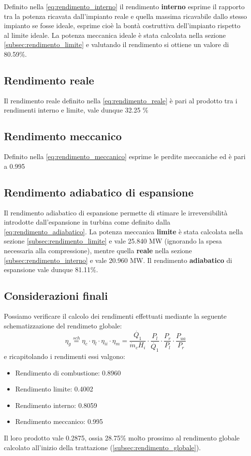 \documentclass[a4paper,12pt]{article}
\begin{document}
Definito nella \eqref{eq:rendimento_interno} il rendimento \textbf{interno} esprime il rapporto tra la potenza ricavata dall'impianto reale
e quella massima ricavabile dallo stesso impianto se fosse ideale, esprime cioè la bontà costruttiva dell'impianto rispetto al limite ideale.
La potenza meccanica ideale è stata calcolata nella sezione \ref{subsec:rendimento_limite} e valutando il rendimento si ottiene un valore di 
80.59\%.

\subsection{Rendimento reale}
Il rendimento reale definito nella \eqref{eq:rendimento_reale} è pari al prodotto tra i rendimenti interno e limite, vale dunque 32.25 \%

\subsection{Rendimento meccanico}
Definito nella \eqref{eq:rendimento_meccanico} esprime le perdite meccaniche ed è pari a 0.995

\subsection{Rendimento adiabatico di espansione}
Il rendimento adiabatico di espansione permette di stimare le irreversibilità introdotte dall'espansione in turbina come definito dalla \eqref{eq:rendimento_adiabatico}.
La potenza meccanica \textbf{limite} è stata calcolata nella sezione \ref{subsec:rendimento_limite} e vale 25.840 MW (ignorando la spesa necessaria alla compressione),
mentre quella \textbf{reale} nella sezione \ref{subsec:rendimento_interno} e vale 20.960 MW.
Il rendimento \textbf{adiabatico} di espansione vale dunque 81.11\%.

\subsection{Considerazioni finali}
Possiamo verificare il calcolo dei rendimenti effettuati mediante la seguente schematizzazione del rendimeto globale:
\begin{equation}
    \eta_g \stackrel{sch}{=} \eta_c \cdot \eta_l \cdot \eta_{ii} \cdot \eta_m
    = \frac{\dot{Q_1}}{\dot{m}_c H_i}\cdot \frac{P_l}{\dot{Q_1}} \cdot \frac{P_r}{P_l}\cdot \frac{P_{ua}}{P_r}
\end{equation}
e ricapitolando i rendimenti essi valgono:
\begin{itemize}
    \item Rendimento di combustione: 0.8960
    \item Rendimento limite: 0.4002
    \item Rendimento interno: 0.8059
    \item Rendimento meccanico: 0.995
\end{itemize}
Il loro prodotto vale 0.2875, ossia 28.75\% molto prossimo al rendimento globale calcolato all'inizio della trattazione (\ref{subsec:rendimento_globale}).
\end{document}
